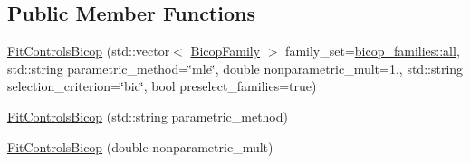\subsection*{Public Member Functions}
\begin{DoxyCompactItemize}
\item 
\hyperlink{classvinecopulib_1_1_fit_controls_bicop_a544d095b0ef0a99e08b8ca60a5753fbe}{Fit\+Controls\+Bicop} (std\+::vector$<$ \hyperlink{namespacevinecopulib_a42e95cc06d33896199caab0c11ad44f3}{Bicop\+Family} $>$ family\+\_\+set=\hyperlink{namespacevinecopulib_1_1bicop__families_a5214a513f41ec23b74782aab96ea6774}{bicop\+\_\+families\+::all}, std\+::string parametric\+\_\+method=\char`\"{}mle\char`\"{}, double nonparametric\+\_\+mult=1., std\+::string selection\+\_\+criterion=\char`\"{}bic\char`\"{}, bool preselect\+\_\+families=true)
\item 
\hyperlink{classvinecopulib_1_1_fit_controls_bicop_a6a2fc00794c9dd9d598ac9948e7b98e4}{Fit\+Controls\+Bicop} (std\+::string parametric\+\_\+method)
\item 
\hyperlink{classvinecopulib_1_1_fit_controls_bicop_a4fc0ec257a3501ebfa15ea36f821cdec}{Fit\+Controls\+Bicop} (double nonparametric\+\_\+mult)
\end{DoxyCompactItemize}
{\bf }\par
